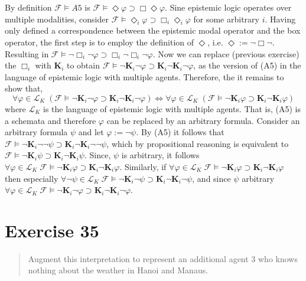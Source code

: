 \documentclass[11pt,a4paper]{article}
\newcommand{\lto}{\supset}
\newcommand{\some}{\Diamond}
\newcommand{\all}{\Box}
\newcommand{\eall}{\mathbf{K}}
\begin{document}
By definition  $\mathcal{F} \models A5$ is  $\mathcal{F} \models \some \varphi \lto \all \some \varphi$. Sine epistemic logic operates over multiple modalities, consider $\mathcal{F} \models \some_i \varphi \lto \all_i \some_i \varphi$ for some arbitrary $i$. Having only defined a correspondence between the epistemic modal operator and the box operator, the first step is to employ the definition of $\some$, i.e. $\some := \neg \all \neg$. Resulting in  $\mathcal{F} \models \neg \all_i \neg \varphi \lto \all_i \neg \all_i \neg \varphi$. Now we can replace (previous exercise) the $\all_i$ with $\eall_i$ to obtain $\mathcal{F} \models \neg \eall_i \neg \varphi \lto \eall_i \neg \eall_i \neg \varphi$, as the version of (A5) in the language of epistemic logic with multiple agents. Therefore, the it remains to show that,
\begin{equation*}
\forall \varphi \in \mathcal{L}_K \; (\mathcal{F} \models \neg \eall_i \neg \varphi \lto \eall_i \neg \eall_i \neg \varphi) \iff \forall \varphi  \in \mathcal{L}_K \; (\mathcal{F} \models \neg \eall_i \varphi \lto \eall_i \neg \eall_i \varphi)
\end{equation*}
where $\mathcal{L}_K$ is the language of epistemic logic with multiple agents.
That is, (A5) is a schemata and therefore $\varphi$ can be replaced by an arbitrary formula. Consider an arbitrary formula $\psi$ and let $\varphi:=\neg \psi$. By (A5) it follows that $ \mathcal{F} \models \neg \eall_i \neg \neg \psi \lto \eall_i \neg \eall_i \neg \neg \psi$, which by propositional reasoning is equivalent to $ \mathcal{F} \models \neg \eall_i \psi \lto \eall_i \neg \eall_i \psi$. Since, $\psi$ is arbitrary, it follows $\forall \varphi  \in \mathcal{L}_K \; \mathcal{F} \models \neg \eall_i \varphi \lto \eall_i \neg \eall_i \varphi$. Similarly, if $\forall \varphi  \in \mathcal{L}_K \; \mathcal{F} \models \neg \eall_i \varphi \lto \eall_i \neg \eall_i \varphi$ then especially $\forall \neg \psi  \in \mathcal{L}_K \; \mathcal{F} \models \neg \eall_i \neg \psi \lto \eall_i \neg \eall_i \neg \psi$, and since $\psi$ arbitrary $\forall \varphi  \in \mathcal{L}_K \; \mathcal{F} \models \neg \eall_i \neg \varphi \lto \eall_i \neg \eall_i \neg \varphi$.


\section*{Exercise 35}
\begin{quote}
Augment this interpretation to represent an additional agent 3 who knows nothing about the weather in Hanoi and Manaus.
\end{quote}
\end{document}
